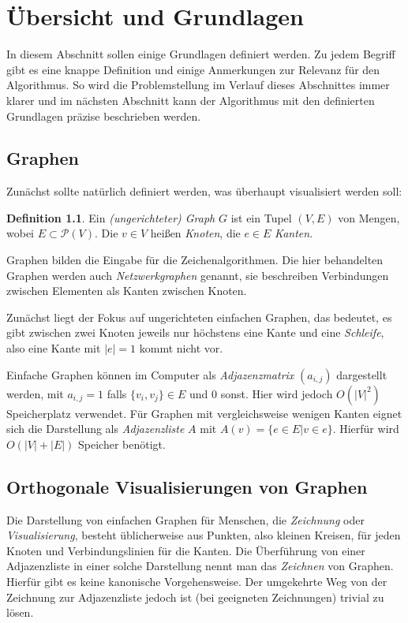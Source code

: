 \documentclass[a4paper]{scrreprt}
\theoremstyle{definition}
\newtheorem{definition}[satz]{Definition}
\begin{document}
\chapter{Übersicht und Grundlagen}

In diesem Abschnitt sollen einige Grundlagen definiert werden. Zu jedem Begriff gibt es eine knappe Definition und einige Anmerkungen zur Relevanz für den Algorithmus. So wird die Problemstellung im Verlauf dieses Abschnittes immer klarer und im nächsten Abschnitt kann der Algorithmus mit den definierten Grundlagen präzise beschrieben werden.

\section{Graphen}

Zunächst sollte natürlich definiert werden, was überhaupt visualisiert werden soll:

\begin{definition}
  Ein \emph{(ungerichteter) Graph} $G$ ist ein Tupel $(V, E)$ von Mengen, wobei $E \subset \mathcal{P}(V)$.
  Die $v \in V$ heißen \emph{Knoten}, die $e \in E$ \emph{Kanten}.
\end{definition}

Graphen bilden die Eingabe für die Zeichenalgorithmen. Die hier behandelten Graphen werden auch \emph{Netzwerkgraphen} genannt, sie beschreiben Verbindungen zwischen Elementen als Kanten zwischen Knoten. 

Zunächst liegt der Fokus auf ungerichteten einfachen Graphen, das bedeutet, es gibt zwischen zwei Knoten jeweils nur höchstens eine Kante und eine \emph{Schleife}, also eine Kante mit $|e| = 1$ kommt nicht vor.

Einfache Graphen können im Computer als \emph{Adjazenzmatrix} $(a_{i,j})$ dargestellt werden, mit $a_{i,j} = 1$ falls $\{v_i, v_j\} \in E$ und $0$ sonst. Hier wird jedoch $O(|V|^2)$ Speicherplatz verwendet. Für Graphen mit vergleichsweise wenigen Kanten eignet sich die Darstellung als \emph{Adjazenzliste} $A$ mit $A(v) = \{e \in E | v \in e\}$. Hierfür wird $O(|V| + |E|)$ Speicher benötigt. %

\section{Orthogonale Visualisierungen von Graphen}

Die Darstellung von einfachen Graphen für Menschen, die \emph{Zeichnung} oder \emph{Visualisierung}, besteht üblicherweise aus Punkten, also kleinen Kreisen, für jeden Knoten und Verbindungslinien für die Kanten. Die Überführung von einer Adjazenzliste in einer solche Darstellung nennt man das \emph{Zeichnen} von Graphen. Hierfür gibt es keine kanonische Vorgehensweise. Der umgekehrte Weg von der Zeichnung zur Adjazenzliste jedoch ist (bei geeigneten Zeichnungen) trivial zu lösen.
\end{document}
